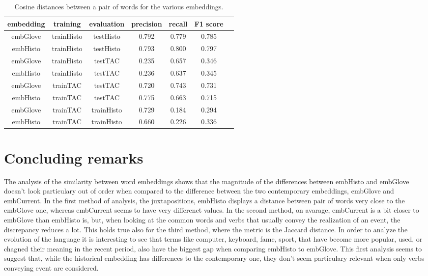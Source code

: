 \documentclass[runningheads]{llncs}
\begin{document}
\begin{table}
\centering
\caption{Cosine distances between a pair of words for the various embeddings.}
\label{tab:nnmodel}
\begin{tabular}{|c|c|c|c|c|c|c|}
\hline
{\bfseries embedding} & {\bfseries training} & {\bfseries evaluation} & {\bfseries precision} & {\bfseries recall} & {\bfseries F1 score}\\
\hline
embGlove &  trainHisto & testHisto & 0.792 & 0.779 & 0.785\\
embHisto &  trainHisto & testHisto & 0.793 & 0.800 & 0.797\\
embGlove &  trainHisto & testTAC & 0.235 & 0.657 & 0.346\\
embHisto &  trainHisto & testTAC & 0.236 & 0.637 & 0.345\\
embGlove &  trainTAC & testTAC & 0.720 & 0.743 & 0.731\\
embHisto &  trainTAC & testTAC & 0.775 & 0.663 & 0.715\\
embGlove &  trainTAC & trainHisto & 0.729 & 0.184 & 0.294\\
embHisto &  trainTAC & trainHisto & 0.660 & 0.226 & 0.336\\
\hline
\end{tabular}
\end{table}

\section{Concluding remarks}

The analysis of the similarity between word embeddings shows that the magnitude of the differences between embHisto and embGlove doesn't look particulary out of order when compared to the difference between the two contemporary embeddings, embGlove and embCurrent. In the first method of analysis, the juxtapositions, embHisto displays a distance between pair of words very close to the embGlove one, whereas embCurrent seems to have very differenet values. In the second method, on avarage, embCurrent is a bit closer to embGlove than embHisto is, but, when looking at the common words and verbs that usually convey the realization of an event, the discrepancy reduces a lot. This holds true also for the third method, where the metric is the Jaccard distance. In order to analyze the evolution of the language it is interesting to see that terms like computer, keyboard, fame, sport, that have become more popular, used, or chagned their meaning in the recent period, also have the biggest gap when comparing embHisto to embGlove. This first analysis seems to suggest that, while the historical embedding has differences to the contemporary one, they don't seem particulary relevant when only verbs conveying event are considered.
\end{document}
